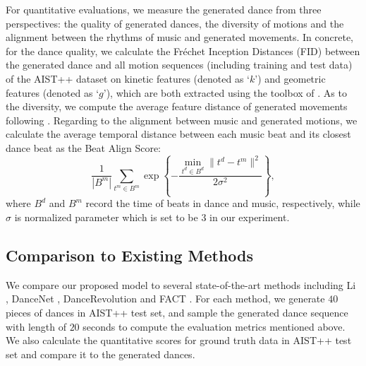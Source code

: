 For quantitative evaluations, we measure the generated dance from three perspectives: the quality of generated dances, the diversity of motions and the alignment between the rhythms of music and generated movements.
In concrete, for the dance quality, we calculate the Fréchet Inception Distances (FID) \cite{heusel2017gans} between the generated dance and all motion sequences (including training and test data) of the AIST++ dataset on kinetic features \cite{onuma2008fmdistance} (denoted as `$k$') and geometric features \cite{muller2005efficient} (denoted as `$g$'), which are both extracted using the toolbox of \cite{gopinath2020fairmotion}.
As to the diversity, we compute the average feature distance of generated movements following \cite{Li2021LearnTD}.
Regarding to the alignment between music and generated motions, we calculate the average temporal distance between each music
beat and its closest dance beat as the Beat Align Score:
\begin{equation}
    \frac{1}{|B^m|}\sum_{t^m \in B^m}\exp{\left\{-\frac{\min_{ t^d \in B^d} {\|t^d - t^m\|^2}}{2\sigma^2}\right\}},
\end{equation}
where $B^d$ and $B^m$ record the time of beats in dance and music, respectively, while $\sigma$ is normalized parameter which is set to be $3$ in our experiment.

\vspace{-3pt}
\subsection{Comparison to Existing Methods}
\vspace{-3pt}

We compare our proposed model
to several state-of-the-art methods including Li \etal \cite{Li2020LearningTG}, DanceNet \cite{Zhuang2020Music2DanceMD}, DanceRevolution \cite{Huang2021DanceRL} and FACT \cite{Li2021LearnTD}.
For each method, we generate $40$ pieces of dances in AIST++ test set,
and sample the generated dance sequence with length of $20$ seconds to compute the evaluation metrics mentioned above.
We also calculate the quantitative scores for ground truth data in AIST++ test set and compare it to the generated dances.


